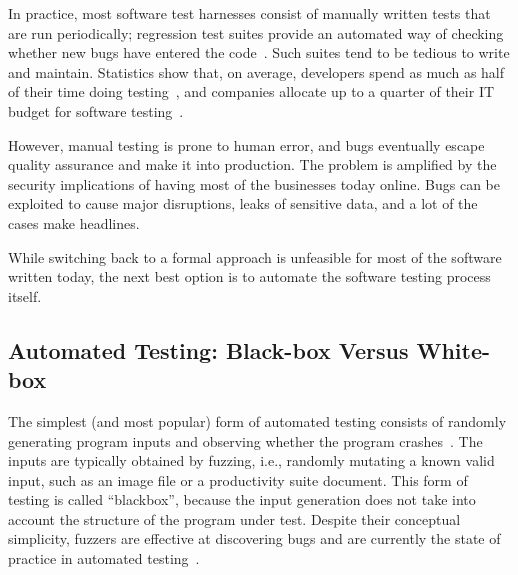 
In practice, most software test harnesses consist of manually written tests that are run periodically; regression test suites provide an automated way of checking whether new bugs have entered the code~\cite{xxx}.
%
Such suites tend to be tedious to write and maintain.  Statistics show that, on average, developers spend as much as half of their time doing testing~\cite{xxx}, and companies allocate up to a quarter of their IT budget for software testing~\cite{xxx}.

However, manual testing is prone to human error, and bugs eventually escape quality assurance and make it into production.  The problem is amplified by the security implications of having most of the businesses today online.  Bugs can be exploited to cause major disruptions, leaks of sensitive data, and a lot of the cases make headlines.


While switching back to a formal approach is unfeasible for most of the software written today, the next best option is to automate the software testing process itself.

\subsection{Automated Testing: Black-box Versus White-box}


The simplest (and most popular) form of automated testing consists of randomly generating program inputs and observing whether the program crashes~\cite{xxx}.  The inputs are typically obtained by fuzzing, i.e., randomly mutating a known valid input, such as an image file or a productivity suite document.
%
This form of testing is called ``blackbox'', because the input generation does not take into account the structure of the program under test.
%
Despite their conceptual simplicity, fuzzers are effective at discovering bugs and are currently the state of practice in automated testing~\cite{xxx}.

